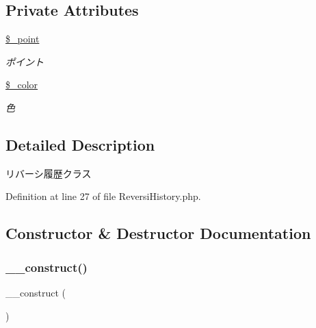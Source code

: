 \subsection*{Private Attributes}
\begin{DoxyCompactItemize}
\item 
\mbox{\label{class_reversi_history_a462074d128a4ffaebbbf2bfad75a528d}} 
\hyperlink{class_reversi_history_a462074d128a4ffaebbbf2bfad75a528d}{\$\+\_\+point}
\begin{DoxyCompactList}\small\item\em ポイント \end{DoxyCompactList}\item 
\mbox{\label{class_reversi_history_a924042a4565897f645c836c1e710b807}} 
\hyperlink{class_reversi_history_a924042a4565897f645c836c1e710b807}{\$\+\_\+color}
\begin{DoxyCompactList}\small\item\em 色 \end{DoxyCompactList}\end{DoxyCompactItemize}


\subsection{Detailed Description}
リバーシ履歴クラス 

Definition at line 27 of file Reversi\+History.\+php.



\subsection{Constructor \& Destructor Documentation}
\mbox{\label{class_reversi_history_a095c5d389db211932136b53f25f39685}} 
\subsubsection{\texorpdfstring{\+\_\+\+\_\+construct()}{\_\_construct()}}
{\footnotesize\ttfamily \+\_\+\+\_\+construct (\begin{DoxyParamCaption}{ }\end{DoxyParamCaption})}



